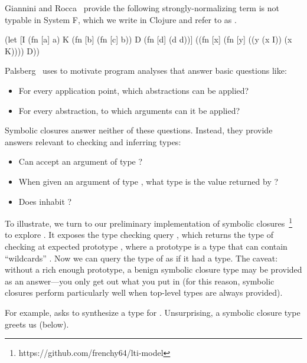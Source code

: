 \documentclass[11pt,final]{iuthesis}
\begin{document}

Giannini and Rocca~\cite{giannini1988characterization}
provide the following strongly-normalizing term is not typable in System F,
which we write in Clojure and refer to as \GRterm.

\begin{cljlisting}
(let [I (fn [a] a)
      K (fn [b] (fn [c] b))
      D (fn [d] (d d))]
  ((fn [x] (fn [y] ((y (x I))
                    (x K))))
   D))
\end{cljlisting}

Palsberg~\cite{Palsberg:1995:CAC:200994.201001}
uses \GRterm to motivate program analyses
that answer basic questions like:
\begin{itemize}
  \item For every application point, which abstractions can be applied?
  \item For every abstraction, to which arguments can it be applied?
\end{itemize}
Symbolic closures answer neither of these questions.
Instead, they provide answers relevant to checking and inferring types:
\begin{itemize}
  \item Can \GRterm accept an argument of type \ltiT{}?
  \item When given an argument of type \ltiT{}, what type is the value returned by \GRterm?
  \item Does \GRterm inhabit \ltiFn{\ltiT{}}{\ltiS{}}?
\end{itemize}

To illustrate, we turn to
our preliminary implementation of symbolic closures~\footnote{https://github.com/frenchy64/lti-model}
to explore \GRterm.
It exposes the type checking query ,
which returns the type of checking  at expected prototype ,
where a prototype is a type that can contain ``wildcards'' .
Now we can query the type of \GRterm as if it had a type.
The caveat: without a rich enough prototype,
a benign symbolic closure type may be provided as an answer---you only get out what you put in
(for this reason, symbolic closures perform particularly well when top-level types are always provided).

For example,  asks to synthesize a type for \GRterm.
Unsurprising, a symbolic closure type greets us (below).
\end{document}
